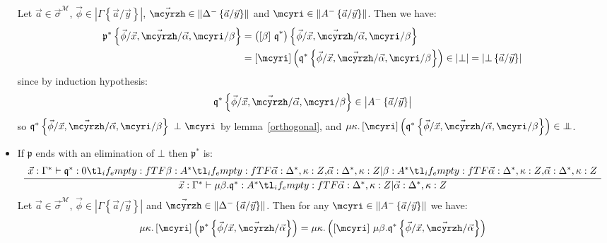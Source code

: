 \documentclass{CSML}
\newcommand*\ifpresent[3]{\tl_if_empty:fTF{#1}{#3}{#2}}
\newcommand*\AXM[1]{\AxiomC{$#1$}}
\newcommand*\UIM[1]{\UnaryInfC{$#1$}}
\newcommand*\DP\DisplayProof
\newcommand*\Entails{\mathrel{\vdash}}
\newcommand*\BarSep{\mathrel{|}}
\newcommand*\Sequent[3]{#1\Entails#2\ifpresent{#3}{\BarSep}{}#3}
\newcommand*\SortA{\sigma}
\newcommand*\LogVarB{y}
\newcommand*\LogNeg[1]{{#1^-}}
\newcommand*\LogBot\bot
\newcommand*\LogFormA{A}
\newcommand*\LogProofA{\mathfrak{p}}
\newcommand*\LogProofB{\mathfrak{q}}
\newcommand*\LogSubst[1]{\left\{#1\right\}}
\newcommand*\ModM{\mathcal{M}}
\newcommand*\ModElemA{a}
\newcommand*\ModMInterp[1]{{#1}^\ModM}
\newcommand*\LmSortBot0
\newcommand*\LmSortExtract{Z}
\newcommand*\LmTerm[2]{#1\mathrel{:}#2}
\newcommand*\LmVarA{x}
\newcommand*\LmMVarA\alpha
\newcommand*\LmMVarB\beta
\newcommand*\LmRuleBotElimFirst[5]{\Sequent{#1}{\LmTerm{#4}{\LmSortBot}}{\LmTerm{#3}{#5}\ifpresent{#2}{,}{}#2}}
\newcommand*\LmRuleBotElimConcl[5]{\Sequent{#1}{\LmTerm{\mu#3.#4}{#5}}{#2}}
\newcommand*\LmRuleBotElim[5]{\AXM{\LmRuleBotElimFirst{#1}{#2}{#3}{#4}{#5}}\UIM{\LmRuleBotElimConcl{#1}{#2}{#3}{#4}{#5}}\DP}
\newcommand*\LmInterpForm[1]{{#1}^*}
\newcommand*\LmInterpProof[1]{{#1}^*}
\newcommand*\CatRCHomA\phi
\newcommand*\CatCHomA\mcyrzh
\newcommand*\CatCHomB\mcyri
\newcommand*\RealValNeg[1]{\left\|#1\right\|}
\newcommand*\RealVal[1]{\left|#1\right|}
\newcommand*\RealBot{{\bot\mkern-11mu\bot}}
\begin{document}
\begin{itemize}
Let $\vec{\ModElemA}\in\ModMInterp{\vec{\SortA}}$, $\vec{\CatRCHomA}\in\RealVal{\Gamma\LogSubst{\vec{\ModElemA}/\vec{\LogVarB}}}$, $\vec{\CatCHomA}\in\RealValNeg{\LogNeg{\Delta}\LogSubst{\vec{\ModElemA}/\vec{\LogVarB}}}$ and $\CatCHomB\in\RealValNeg{\LogNeg{\LogFormA}\LogSubst{\vec{\ModElemA}/\vec{\LogVarB}}}$. Then we have:
\begin{align*}
\LmInterpProof{\LogProofA}\LogSubst{\vec{\CatRCHomA}/\vec{\LmVarA},\vec{\CatCHomA}/\vec{\LmMVarA},\CatCHomB/\LmMVarB}&=\left(\LmInterpForm{\left[\LmMVarB\right]\,\LogProofB}\right)\LogSubst{\vec{\CatRCHomA}/\vec{\LmVarA},\vec{\CatCHomA}/\vec{\LmMVarA},\CatCHomB/\LmMVarB}\\
&=\left[\CatCHomB\right]\left(\LmInterpProof{\LogProofB}\LogSubst{\vec{\CatRCHomA}/\vec{\LmVarA},\vec{\CatCHomA}/\vec{\LmMVarA},\CatCHomB/\LmMVarB}\right)\in\RealVal{\LogBot}=\RealVal{\LogBot\LogSubst{\vec{\ModElemA}/\vec{\LogVarB}}}
\end{align*}
since by induction hypothesis:
$$\LmInterpProof{\LogProofB}\LogSubst{\vec{\CatRCHomA}/\vec{\LmVarA},\vec{\CatCHomA}/\vec{\LmMVarA},\CatCHomB/\LmMVarB}\in\RealVal{\LogNeg{\LogFormA}\LogSubst{\vec{\ModElemA}/\vec{\LogVarB}}}$$
so $\LmInterpProof{\LogProofB}\LogSubst{\vec{\CatRCHomA}/\vec{\LmVarA},\vec{\CatCHomA}/\vec{\LmMVarA},\CatCHomB/\LmMVarB}\ \bot\ \CatCHomB$ by lemma~\ref{orthogonal}, and $\mu\kappa.\left[\CatCHomB\right]\left(\LmInterpProof{\LogProofB}\LogSubst{\vec{\CatRCHomA}/\vec{\LmVarA},\vec{\CatCHomA}/\vec{\LmMVarA},\CatCHomB/\LmMVarB}\right)\in\RealBot$.
\item If $\LogProofA$ ends with an elimination of $\LogBot$ then $\LmInterpProof{\LogProofA}$ is:
$$\LmRuleBotElim{\LmTerm{\vec{\LmVarA}}{\LmInterpForm{\Gamma}}}{\LmTerm{\vec{\LmMVarA}}{\LmInterpForm{\Delta}},\LmTerm{\kappa}{\LmSortExtract}}{\LmMVarB}{\LmInterpProof{\LogProofB}}{\LmInterpForm{\LogFormA}}$$
Let $\vec{\ModElemA}\in\ModMInterp{\vec{\SortA}}$, $\vec{\CatRCHomA}\in\RealVal{\Gamma\LogSubst{\vec{\ModElemA}/\vec{\LogVarB}}}$ and $\vec{\CatCHomA}\in\RealValNeg{\LogNeg{\Delta}\LogSubst{\vec{\ModElemA}/\vec{\LogVarB}}}$. Then for any $\CatCHomB\in\RealValNeg{\LogNeg{\LogFormA}\LogSubst{\vec{\ModElemA}/\vec{\LogVarB}}}$ we have:
\begin{align*}\mu\kappa.\left[\CatCHomB\right]\left(\LmInterpProof{\LogProofA}\LogSubst{\vec{\CatRCHomA}/\vec{\LmVarA},\vec{\CatCHomA}/\vec{\LmMVarA}}\right)&=\mu\kappa.\left(\left[\CatCHomB\right]\,\mu\LmMVarB.\LmInterpProof{\LogProofB}\LogSubst{\vec{\CatRCHomA}/\vec{\LmVarA},\vec{\CatCHomA}/\vec{\LmMVarA}}\right)\\

\end{align*}
\end{itemize}
\end{document}

